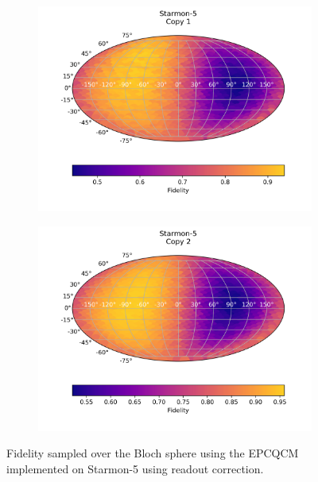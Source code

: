   \begin{figure}[H]
    \centering
    \begin{subfigure}{.5\textwidth}
      \centering
      \includegraphics[width=\textwidth]{Figures/Economical/Starmon/FullSphere/results_starmon_copy1.png}
      \label{fig:epc_uncorrected_starmon_sphere_1}
    \end{subfigure}%
    \begin{subfigure}{.5\textwidth}
      \centering
      \includegraphics[width=\textwidth]{Figures/Economical/Starmon/FullSphere/results_starmon_copy2.png}
      \label{fig:epc_uncorrected_starmon_sphere_2}
    \end{subfigure}
    \caption{Fidelity sampled over the Bloch sphere using the EPCQCM implemented on Starmon-5 using readout correction.}
    \label{fig:epc_uncorrected_starmon_sphere}
  \end{figure}
  
